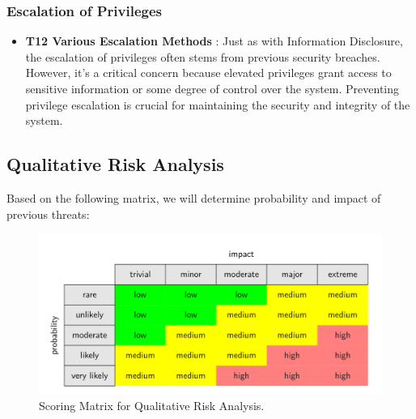 \documentclass[12pt]{article}
\begin{document}
\subsubsection*{Escalation of Privileges}
\begin{itemize}
    \item \textbf{ T12 Various Escalation Methods }: Just as with Information Disclosure, the escalation of privileges often stems from previous security breaches. However, it's a critical concern because elevated privileges grant access to sensitive information or some degree of control over the system. Preventing privilege escalation is crucial for maintaining the security and integrity of the system.
\end{itemize}


\newpage

\subsection{ Qualitative Risk Analysis }
Based on the following matrix, we will determine probability and impact of previous threats:

\begin{figure}[h]
    \centering
    \includegraphics[height=0.35\textwidth]{Figures/Risk Assesment/Qualitative_Matrix.png}
    \caption{Scoring Matrix for Qualitative Risk Analysis.}
\end{figure}
\end{document}
